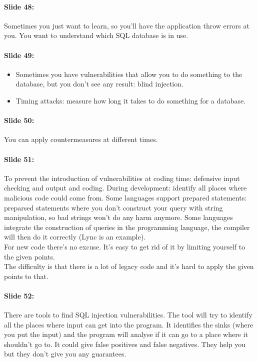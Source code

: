 \documentclass[10pt,a4paper]{report}
\begin{document}
\paragraph{Slide 48:} Sometimes you just want to learn, so you'll have the application throw errors at you. You want to understand which SQL database is in use. 

\paragraph{Slide 49:}
\begin{itemize}
\item Sometimes you have vulnerabilities that allow you to do something to the database, but you don't see any result: blind injection.
\item Timing attacks: measure how long it takes to do something for a database.
\end{itemize}

\paragraph{Slide 50:} You can apply countermeasures at different times.

\paragraph{Slide 51:} To prevent the introduction of vulnerabilities at coding time: defensive input checking and output and coding. During development: identify all places where malicious code could come from. Some languages support prepared statements: preparsed statements where you don't construct your query with string manipulation, so bad strings won't do any harm anymore. Some languages integrate the construction of queries in the programming language, the compiler will then do it correctly (Lync is an example). \\
For new code there's no excuse. It's easy to get rid of it by limiting yourself to the given points.\\
The difficulty is that there is a lot of legacy code and it's hard to apply the given points to that.

\paragraph{Slide 52:} There are tools to find SQL injection vulnerabilities. The tool will try to identify all the places where input can get into the program. It identifies the sinks (where you put the input) and the program will analyse if it can go to a place where it shouldn't go to. It could give false positives and false negatives. They help you but they don't give you any guarantees.
\end{document}
